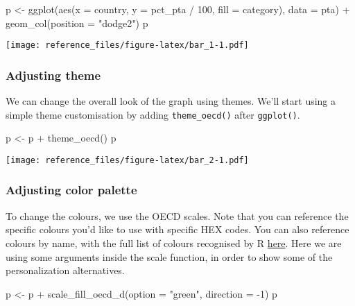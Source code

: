 \documentclass[
]{article}
\newenvironment{Shaded}{\begin{snugshade}}{\end{snugshade}}
\newcommand{\AttributeTok}[1]{\textcolor[rgb]{0.77,0.63,0.00}{#1}}
\newcommand{\DecValTok}[1]{\textcolor[rgb]{0.00,0.00,0.81}{#1}}
\newcommand{\FunctionTok}[1]{\textcolor[rgb]{0.00,0.00,0.00}{#1}}
\newcommand{\NormalTok}[1]{#1}
\newcommand{\OtherTok}[1]{\textcolor[rgb]{0.56,0.35,0.01}{#1}}
\newcommand{\SpecialCharTok}[1]{\textcolor[rgb]{0.00,0.00,0.00}{#1}}
\newcommand{\StringTok}[1]{\textcolor[rgb]{0.31,0.60,0.02}{#1}}
\begin{document}
\begin{Shaded}
\begin{Highlighting}[]
\NormalTok{p }\OtherTok{\textless{}{-}} \FunctionTok{ggplot}\NormalTok{(}\FunctionTok{aes}\NormalTok{(}\AttributeTok{x =}\NormalTok{ country, }\AttributeTok{y =}\NormalTok{ pct\_pta }\SpecialCharTok{/} \DecValTok{100}\NormalTok{, }\AttributeTok{fill =}\NormalTok{ category), }\AttributeTok{data =}\NormalTok{ pta) }\SpecialCharTok{+}
  \FunctionTok{geom\_col}\NormalTok{(}\AttributeTok{position =} \StringTok{"dodge2"}\NormalTok{)}
\NormalTok{p}
\end{Highlighting}
\end{Shaded}

\texttt{[image: reference\_files/figure-latex/bar\_1-1.pdf]}

\hypertarget{adjusting-theme}{%
\subsubsection{Adjusting theme}\label{adjusting-theme}}

We can change the overall look of the graph using themes. We'll start
using a simple theme customisation by adding \texttt{theme\_oecd()}
after \texttt{ggplot()}.

\begin{Shaded}
\begin{Highlighting}[]
\NormalTok{p }\OtherTok{\textless{}{-}}\NormalTok{ p }\SpecialCharTok{+} 
  \FunctionTok{theme\_oecd}\NormalTok{()}
\NormalTok{p}
\end{Highlighting}
\end{Shaded}

\texttt{[image: reference\_files/figure-latex/bar\_2-1.pdf]}

\hypertarget{adjusting-color-palette}{%
\subsubsection{Adjusting color palette}\label{adjusting-color-palette}}

To change the colours, we use the OECD scales. Note that you can
reference the specific colours you'd like to use with specific HEX
codes. You can also reference colours by name, with the full list of
colours recognised by R
\href{http://www.stat.columbia.edu/~tzheng/files/Rcolor.pdf}{here}. Here
we are using some arguments inside the scale function, in order to show
some of the personalization alternatives.

\begin{Shaded}
\begin{Highlighting}[]
\NormalTok{p }\OtherTok{\textless{}{-}}\NormalTok{ p }\SpecialCharTok{+}
  \FunctionTok{scale\_fill\_oecd\_d}\NormalTok{(}\AttributeTok{option =} \StringTok{"green"}\NormalTok{, }\AttributeTok{direction =} \SpecialCharTok{{-}}\DecValTok{1}\NormalTok{)}
\NormalTok{p}
\end{Highlighting}
\end{Shaded}
\end{document}
